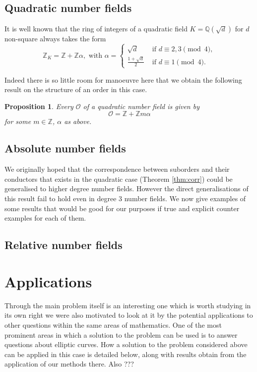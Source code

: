 \documentclass[11pt,a4paper]{report}
\newtheorem{prop}{Proposition}
\theoremstyle{definition}
\begin{document}
\section{Quadratic number fields}

It is well known \cite{} that the ring of integers of a quadratic field $K = \mathbb{Q}(\sqrt{d})$ for $d$ non-square always takes the form
\[\mathbb{Z}_K = \mathbb{Z} + \mathbb{Z}\alpha,\text{ with } \alpha =\begin{cases}
\sqrt{d}&\text{ if $d\equiv 2,3\pmod{4}$},\\
\frac{1+\sqrt{d}}{2}&\text{ if $d\equiv 1\pmod{4}$}.
\end{cases}\]

Indeed there is so little room for manoeuvre here that we obtain the following result on the structure of an order in this case.

\begin{prop}
Every $\mathcal{O}$ of a quadratic number field is given by 
\[\mathcal{O} = \mathbb{Z} + \mathbb{Z}m\alpha\]
for some $m\in \mathbb{Z}$, $\alpha$ as above.
\end{prop}


\section{Absolute number fields}

We originally hoped that the correspondence between suborders and their conductors that exists in the quadratic case (Theorem \ref{thm:corr}) could be generalised to higher degree number fields.
However the direct generalisations of this result fail to hold even in degree 3 number fields.
We now give examples of some results that would be good for our purposes if true and explicit counter examples for each of them.


\section{Relative number fields}



\chapter{Applications}

Through the main problem itself is an interesting one which is worth studying in its own right we were also motivated to look at it by the potential applications to other questions within the same areas of mathematics.
One of the most prominent areas in which a solution to the problem can be used is to answer questions about elliptic curves.
How a solution to the problem considered above can be applied in this case is detailed below, along with results obtain from the application of our methods there.
Also ???
\end{document}

